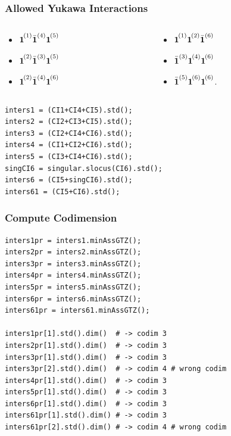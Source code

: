 \documentclass[notes=hide]{beamer}
\newcommand\mc[1]{{\vphantom{\bar{\boldsymbol{1}}}\boldsymbol{1}}^{\mkern-2mu (#1)}}
\newcommand{\mcb}[1]{\bar{\boldsymbol{1}}^{(#1)}}
\newcommand{\ya}{\mc{1}\mcb{4}\mc{5}}
\newcommand{\yb}{\mc{2}\mcb{3}\mc{5}}
\newcommand{\yc}{\mc{2}\mcb{4}\mc{6}}
\newcommand{\yd}{\mc{1}\mc{2}\mcb{6}}
\newcommand{\ye}{\mcb{3}\mc{4}\mc{6}}
\newcommand{\yfs}{\mcb{5}\mc{6}\mc{6}}
\begin{document}
\begin{frame}[fragile]
\frametitle{Allowed Yukawa Interactions}
\begin{columns}[onlytextwidth]
	\begin{column}{0.5\textwidth}
	\begin{itemize}
	\item $\ya$
	\item $\yb$
	\item  $\yc$
	\end{itemize}
	\end{column}
	\begin{column}{0.5\textwidth}
	\begin{itemize}
	\item $\yd$
	\item $\ye$
	\item $\yfs$.
	\end{itemize}
	\end{column}
\end{columns}
\pause
\vspace{1em}
\begin{lstlisting}
inters1 = (CI1+CI4+CI5).std();
inters2 = (CI2+CI3+CI5).std();
inters3 = (CI2+CI4+CI6).std();
inters4 = (CI1+CI2+CI6).std();
inters5 = (CI3+CI4+CI6).std();
singCI6 = singular.slocus(CI6).std();
inters6 = (CI5+singCI6).std();
inters61 = (CI5+CI6).std();
\end{lstlisting}
\end{frame}

\begin{frame}[fragile]
\frametitle{Compute Codimension}
\begin{lstlisting}
inters1pr = inters1.minAssGTZ();
inters2pr = inters2.minAssGTZ();
inters3pr = inters3.minAssGTZ();
inters4pr = inters4.minAssGTZ();
inters5pr = inters5.minAssGTZ();
inters6pr = inters6.minAssGTZ();
inters61pr = inters61.minAssGTZ();

inters1pr[1].std().dim()  # -> codim 3
inters2pr[1].std().dim()  # -> codim 3
inters3pr[1].std().dim()  # -> codim 3
inters3pr[2].std().dim()  # -> codim 4 # wrong codim
inters4pr[1].std().dim()  # -> codim 3
inters5pr[1].std().dim()  # -> codim 3
inters6pr[1].std().dim()  # -> codim 3
inters61pr[1].std().dim() # -> codim 3
inters61pr[2].std().dim() # -> codim 4 # wrong codim
\end{lstlisting}
\end{frame}
\end{document}
